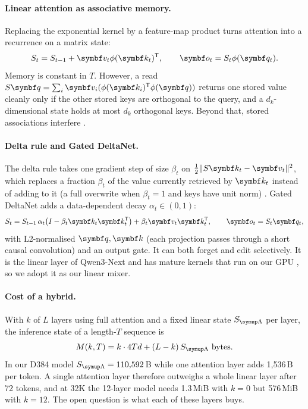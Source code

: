 \documentclass[10pt,a4paper]{article}
\begin{document}
\paragraph{Linear attention as associative memory.} Replacing the exponential kernel by a feature-map
product \citep{katharopoulos2020transformers} turns attention into a recurrence on a matrix state:
\begin{equation}\label{eq:lin}
  S_t=S_{t-1}+\vect{v}_t\phi(\vect{k}_t)^{\T},\qquad \vect{o}_t=S_t\phi(\vect{q}_t).
\end{equation}
Memory is constant in $T$. However, a read $S\vect{q}=\sum_i\vect{v}_i(\phi(\vect{k}_i)^{\T}\phi(\vect{q}))$ returns one
stored value cleanly only if the other stored keys are orthogonal to the query, and a $d_k$-dimensional state holds at most $d_k$ orthogonal keys. Beyond that, stored
associations interfere \citep{schlag2021linear}.

\paragraph{Delta rule and Gated DeltaNet.} The delta rule takes one gradient step of size $\beta_t$ on
$\tfrac12\lVert S\vect{k}_t-\vect{v}_t\rVert^2$, which replaces a fraction $\beta_t$ of the value currently retrieved by $\vect{k}_t$ instead
of adding to it (a full overwrite when $\beta_t=1$ and keys have unit norm) \citep{schlag2021linear,yang2024deltanet}. Gated DeltaNet \citep{yang2025gated} adds a
data-dependent decay $\alpha_t\in(0,1)$:
\begin{equation}\label{eq:gdn}
  S_t=S_{t-1}\,\alpha_t\big(I-\beta_t\vect{k}_t\vect{k}_t^{\T}\big)+\beta_t\vect{v}_t\vect{k}_t^{\T},
  \qquad \vect{o}_t=S_t\vect{q}_t ,
\end{equation}
with L2-normalised $\vect{q},\vect{k}$ (each projection passes through a short causal convolution) and an output gate. It can both forget and edit
selectively. It is the linear layer of Qwen3-Next and has mature kernels that run on our GPU
\citep{fla2024}, so we adopt it as our linear mixer.

\paragraph{Cost of a hybrid.} With $k$ of $L$ layers using full attention and a fixed linear state
$S_{\Lin}$ per layer, the inference state of a length-$T$ sequence is
\begin{equation}\label{eq:state}
  M(k,T)=k\cdot 4Td+(L-k)\,S_{\Lin}\ \text{bytes}.
\end{equation}
In our D384 model $S_{\Lin}=110{,}592$\,B while one attention layer adds 1,536\,B per token. A single
attention layer therefore outweighs a whole linear layer after 72 tokens, and at 32K the 12-layer model
needs 1.3\,MiB with $k=0$ but 576\,MiB with $k=12$. The open question is what each of these layers buys.
\end{document}
